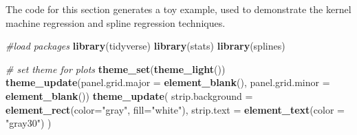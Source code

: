 \documentclass[12pt, twoside]{amherstthesis}
\newenvironment{Shaded}{\begin{snugshade}}{\end{snugshade}}
\newcommand{\AttributeTok}[1]{\textcolor[rgb]{0.13,0.29,0.53}{#1}}
\newcommand{\CommentTok}[1]{\textcolor[rgb]{0.56,0.35,0.01}{\textit{#1}}}
\newcommand{\FunctionTok}[1]{\textcolor[rgb]{0.13,0.29,0.53}{\textbf{#1}}}
\newcommand{\NormalTok}[1]{#1}
\newcommand{\StringTok}[1]{\textcolor[rgb]{0.31,0.60,0.02}{#1}}
\begin{document}
The code for this section generates a toy example, used to demonstrate the kernel machine regression and spline regression techniques.

\scriptsize
\begin{Shaded}
\begin{Highlighting}[]
\CommentTok{\#load packages}
\FunctionTok{library}\NormalTok{(tidyverse)}
\FunctionTok{library}\NormalTok{(stats)}
\FunctionTok{library}\NormalTok{(splines)}
\end{Highlighting}
\end{Shaded}
\normalsize

\scriptsize
\begin{Shaded}
\begin{Highlighting}[]
\CommentTok{\# set theme for plots}
\FunctionTok{theme\_set}\NormalTok{(}\FunctionTok{theme\_light}\NormalTok{())}
\FunctionTok{theme\_update}\NormalTok{(}\AttributeTok{panel.grid.major =} \FunctionTok{element\_blank}\NormalTok{(), }
             \AttributeTok{panel.grid.minor =} \FunctionTok{element\_blank}\NormalTok{())}
\FunctionTok{theme\_update}\NormalTok{(}
  \AttributeTok{strip.background =} \FunctionTok{element\_rect}\NormalTok{(}\AttributeTok{color=}\StringTok{"gray"}\NormalTok{, }\AttributeTok{fill=}\StringTok{"white"}\NormalTok{), }
  \AttributeTok{strip.text =} \FunctionTok{element\_text}\NormalTok{(}\AttributeTok{color =} \StringTok{"gray30"}\NormalTok{)}
\NormalTok{  )}
\end{Highlighting}
\end{Shaded}
\normalsize
\end{document}
